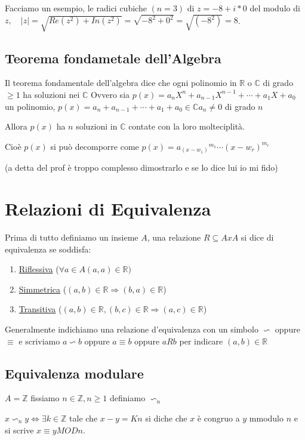 \documentclass{article}
\begin{document}
Facciamo un esempio, le radici cubiche $(n=3)$ di $z = -8 +i*0$ del modulo di $z, \quad|z| = \sqrt{Re(z^2)+In(z^2)} = \sqrt{-8^2 + 0^2} = \sqrt{(-8^2)} = 8$.


\subsection{Teorema fondametale dell'Algebra}
Il teorema fondamentale dell'algebra dice che ogni polinomio in $\mathbb{R}$ o $\mathbb{C}$ di grado $\geq 1$ ha soluzioni nei $\mathbb{C}$ \newline 
Ovvero sia $p(x) = a_n X^n + a_{n-1} X^{n-1} + \cdots + a_1 X + a_0$ un polinomio, $p(x) = a_n  + a_{n-1} + \cdots + a_1 + a_0 \in \mathbb{C} a_n \not = 0$ di grado $n$ \par
Allora $p(x)$ ha $n$ soluzioni in $\mathbb{C}$ contate con la loro molteciplità.\par
Cioè $p(x)$ si può decomporre come $p(x) = {a_(x-w_1)}^{m_1} \cdots {(x-w_r)}^{m_r}$ \newline

(a detta del prof è troppo complesso dimostrarlo e se lo dice lui io mi fido)





\newpage
\section{Relazioni di Equivalenza}
Prima di tutto definiamo un insieme $A$, una relazione $R \subseteq AxA$ si dice di equivalenza se soddisfa:

\begin{enumerate}
        \item \underline{Riflessiva} ($\forall a \in A (a,a) \in \mathbb{R})$
        \item \underline{Simmetrica} ($(a,b) \in \mathbb{R} \Rightarrow (b,a) \in \mathbb{R}$)
        \item \underline{Transitiva} ($(a,b) \in \mathbb{R},(b,c) \in \mathbb{R} \Rightarrow (a,c) \in \mathbb{R}$)
\end{enumerate}


Generalmente indichiamo una relazione d'equivalenza con un simbolo  $\backsim$ oppure $\equiv$ e scriviamo $a \backsim b$ oppure $a \equiv b$ oppure $aRb$ per indicare $(a,b) \in \mathbb{R}$


\subsection{Equivalenza modulare}
$A = \mathbb{Z}$ fissiamo $n \in \mathbb{Z}, n \geq 1$ definiamo $\backsim_n$ \par
$x \backsim_n y \Leftrightarrow \exists k \in \mathbb{Z}$ tale che $x-y = Kn$ si diche che $x$ è congruo a $y$ mmodulo $n$ e si scrive $x \equiv y MOD n$.
\end{document}
